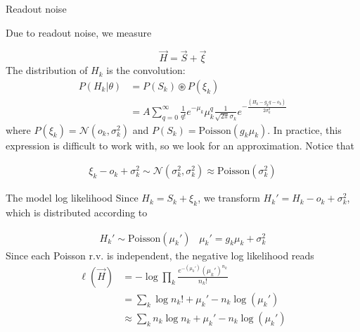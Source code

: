 \documentclass[aspectratio=169]{beamer}
\begin{document}
\begin{frame}{Readout noise}

Due to readout noise, we measure

\begin{equation*}
\vec{H} = \vec{S} + \vec{\xi}
\end{equation*}
The distribution of $H_{k}$ is the convolution:
\begin{align*}
P(H_{k}|\theta) &= P(S_{k})\circledast P(\xi_{k})\\
&= A\sum_{q=0}^{\infty} \frac{1}{q!}e^{-\mu_{k}}\mu_{k}^{q}\frac{1}{\sqrt{2\pi}\sigma_{k}}e^{-\frac{(H_{k}-g_{k}q-o_{k})}{2\sigma_{k}^{2}}}
\end{align*}
where $P(\xi_{k}) = \mathcal{N}(o_{k},\sigma_{k}^{2})$ and $P(S_{k}) = \mathrm{Poisson}(g_{k}\mu_{k})$. In practice, this expression is difficult to work with, so we look for an approximation. Notice that 

\begin{align*}
\xi_{k} - o_{k} + \sigma_{k}^{2} \sim \mathcal{N}(\sigma_{k}^{2},\sigma_{k}^{2}) \approx \mathrm{Poisson}(\sigma_{k}^{2})
\end{align*}

\end{frame}

\begin{frame}{The model log likelihood}
Since $H_{k} = S_{k} + \xi_{k}$, we transform $H_{k}' = H_{k} - o_{k} + \sigma_{k}^{2}$, which is distributed according to 

\begin{align*}
H_{k}' \sim \mathrm{Poisson}(\mu_{k}')\;\;\;\mu_{k}' = g_{k}\mu_{k} + \sigma_{k}^{2}
\end{align*}
Since each Poisson r.v. is independent, the negative log likelihood reads
\begin{align*}
\ell(\vec{H}) &= -\log \prod_{k} \frac{e^{-\left(\mu_{k}'\right)}\left(\mu_{k}'\right)^{n_{k}}}{n_{k}!}\\
&= \sum_{k}  \log n_{k}! + \mu_{k}' - n_{k}\log\left(\mu_{k}'\right)\\
&\approx \sum_{k}  n_{k}\log n_{k} + \mu_{k}' - n_{k}\log\left(\mu_{k}'\right)
\end{align*}

\end{frame}
\end{document}

